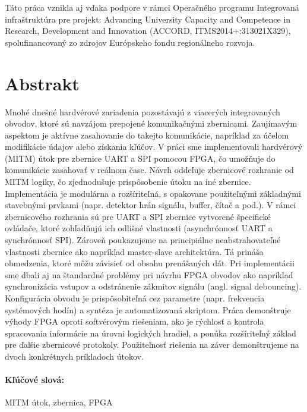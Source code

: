 \documentclass[12pt, twoside]{book}
\begin{document}
Táto práca vznikla aj vďaka podpore v rámci Operačného programu Integrovaná infraštruktúra pre projekt: Advancing University Capacity and Competence in Research, Development and Innovation (ACCORD, ITMS2014+:313021X329), spolufinancovaný zo zdrojov Európskeho fondu regionálneho rozvoja.


\newpage 
\section*{Abstrakt}

Mnohé dnešné hardvérové zariadenia pozostávajú z viacerých integrovaných obvodov, ktoré sú navzájom prepojené komunikačnými zbernicami. Zaujímavým aspektom je aktívne zasahovanie do takejto komunikácie, napríklad za účelom modifikácie údajov alebo získania kľúčov. V práci sme implementovali hardvérový  (MITM) útok pre zbernice UART a SPI pomocou FPGA, čo umožňuje do komunikácie zasahovať v reálnom čase. Návrh oddeľuje zbernicové rozhranie od MITM logiky, čo zjednodušuje prispôsobenie útoku na iné zbernice. Implementácia je modulárna a rozšíriteľná, s opakovane použiteľnými základnými stavebnými prvkami (napr. detektor hrán signálu, buffer, čítač a pod.). V rámci zbernicového rozhrania sú pre UART a SPI zbernice vytvorené špecifické ovládače, ktoré zohľadňujú ich odlišné vlastnosti (asynchrónnosť UART a synchrónnosť SPI). Zároveň poukazujeme na principiálne neabstrahovateľné vlastnosti zbernice ako napríklad master-slave architektúra. Tá prináša obmedzenia, ktoré môžu závisieť od obsahu prenášaných dát. Pri implementácii sme dbali aj na štandardné problémy pri návrhu FPGA obvodov ako napríklad synchronizácia vstupov a odstránenie zákmitov signálu (angl. signal debouncing). Konfigurácia obvodu je prispôsobiteľná cez parametre (napr. frekvencia systémových hodín) a syntéza je automatizovaná skriptom. Práca demonštruje výhody FPGA oproti softvérovým riešeniam, ako je rýchlosť a kontrola spracovania informácie na úrovni logických hradiel, a ponúka rozšíriteľný základ pre ďalšie zbernicové protokoly. Použiteľnosť riešenia na záver demonštrujeme na dvoch konkrétnych príkladoch útokov.

\paragraph*{Kľúčové slová:} MITM útok, zbernica, FPGA
\end{document}
